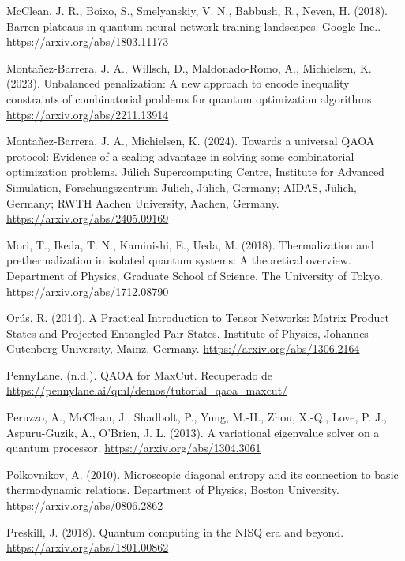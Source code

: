 \begin{thebibliography}{a}
McClean, J. R., Boixo, S., Smelyanskiy, V. N., Babbush, R., Neven, H. (2018). Barren plateaus in quantum neural network training landscapes. Google Inc..
\url{https://arxiv.org/abs/1803.11173}

Montañez-Barrera, J. A., Willsch, D., Maldonado-Romo, A., Michielsen, K. (2023). Unbalanced penalization: A new approach to encode inequality constraints of combinatorial problems for quantum optimization algorithms.
\url{https://arxiv.org/abs/2211.13914}

Montañez-Barrera, J. A.,  Michielsen, K. (2024). Towards a universal QAOA protocol: Evidence of a scaling advantage in solving some combinatorial optimization problems. Jülich Supercomputing Centre, Institute for Advanced Simulation, Forschungszentrum Jülich, Jülich, Germany; AIDAS, Jülich, Germany; RWTH Aachen University, Aachen, Germany.
\url{https://arxiv.org/abs/2405.09169}

Mori, T., Ikeda, T. N., Kaminishi, E., Ueda, M. (2018). Thermalization and prethermalization in isolated quantum systems: A theoretical overview. Department of Physics, Graduate School of Science, The University of Tokyo.
\url{https://arxiv.org/abs/1712.08790}

Orús, R. (2014). A Practical Introduction to Tensor Networks: Matrix Product States and Projected Entangled Pair States. Institute of Physics, Johannes Gutenberg University, Mainz, Germany.
\url{https://arxiv.org/abs/1306.2164}

PennyLane. (n.d.). QAOA for MaxCut. Recuperado de
\url{https://pennylane.ai/qml/demos/tutorial_qaoa_maxcut/}

Peruzzo, A., McClean, J., Shadbolt, P., Yung, M.-H., Zhou, X.-Q., Love, P. J., Aspuru-Guzik, A., O’Brien, J. L. (2013). A variational eigenvalue solver on a quantum processor. \url{https://arxiv.org/abs/1304.3061}

Polkovnikov, A. (2010). Microscopic diagonal entropy and its connection to basic thermodynamic relations. Department of Physics, Boston University.
\url{https://arxiv.org/abs/0806.2862}

Preskill, J. (2018). Quantum computing in the NISQ era and beyond.
\url{https://arxiv.org/abs/1801.00862}


\end{thebibliography}
